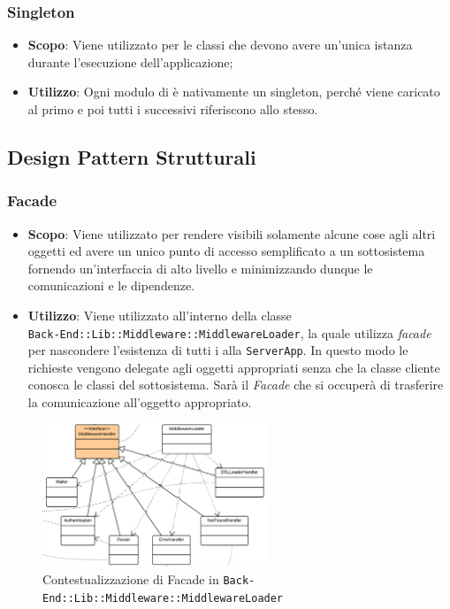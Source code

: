 \subsubsection{Singleton}

\begin{itemize}

	\item \textbf{Scopo}: Viene utilizzato per le classi che devono avere un'unica istanza durante l'esecuzione dell'applicazione;
	\item \textbf{Utilizzo}: Ogni modulo di  è nativamente un singleton, perché viene caricato al primo  e poi tutti i successivi riferiscono allo stesso.

\end{itemize}

\subsection{Design Pattern Strutturali}

\subsubsection{Facade}

\begin{itemize}

	\item \textbf{Scopo}: Viene utilizzato per rendere visibili solamente alcune cose agli altri oggetti ed avere un unico punto di accesso semplificato a un sottosistema fornendo un'interfaccia di alto livello e minimizzando dunque le comunicazioni e le dipendenze.
	\item \textbf{Utilizzo}: Viene utilizzato all'interno della classe \\ \texttt{Back-End::Lib::Middleware::MiddlewareLoader}, la quale utilizza \textit{facade} per nascondere l'esistenza di tutti i  alla \texttt{ServerApp}. In questo modo le richieste vengono delegate agli oggetti appropriati senza che la classe cliente conosca le classi del sottosistema. Sarà il \textit{Facade} che si occuperà di trasferire la comunicazione all'oggetto appropriato.
\end{itemize}

\begin{figure}[H]

\centering \includegraphics[width=0.6\textwidth]{patterns/contestualizzazione/facade1.png}
\caption{Contestualizzazione di Facade in \texttt{Back-End::Lib::Middleware::MiddlewareLoader}}
\label{fig:mvc}
\end{figure}

